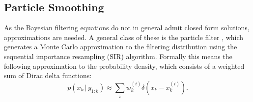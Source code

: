 \documentclass[twocolumn]{autart}    %
\newtheorem{algo}{Algorithm}[section]
\begin{document}
\subsection{Particle Smoothing}
%
As the Bayesian filtering equations do not in general admit closed form solutions, approximations are needed. A general class of these is the particle filter \cite{Gordon+Salmon+Smith:1993,Kitagawa:1996,Doucet+Godsill+Andrieu:2000,Ristic+Arulampalam+Gordon:2004,Cappe+Godsill+Moulines:2007}, which generates a Monte Carlo approximation to the filtering distribution using the sequential importance resampling (SIR) algorithm. Formally this means the following approximation to the probability density, which consists of a weighted sum of Dirac delta functions:
%
\begin{equation}
  p(x_k\,|\,y_{1:k}) \approx \sum_i w_k^{(i)} \delta(x_k - x_k^{(i)}).
\label{eq:pfapp}
\end{equation}
%
%
%
%
%
\end{document}
